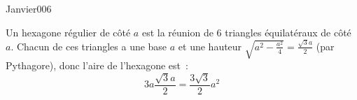\begin{corrige}{Janvier006}


Un hexagone régulier de côté $a$ est la réunion de 6 triangles équilatéraux de
côté $a$. Chacun de ces triangles a une base $a$ et une hauteur $\sqrt{a^2 -
\frac{a^2}4} = \frac{\sqrt{3}a}2$ (par Pythagore), donc l'aire de l'hexagone est~:
\begin{equation*}
  3 a \frac{\sqrt{3}a}2 = \frac{3\sqrt 3}{2} a^2
\end{equation*}


\end{corrige}
